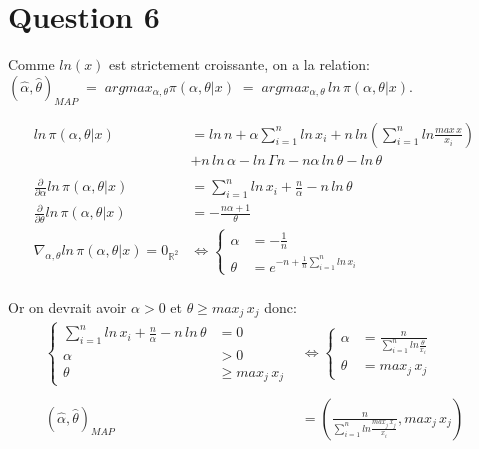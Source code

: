 \documentclass[
  12pt,
]{scrreprt}
\begin{document}
\hypertarget{question-6}{%
\section{Question 6}\label{question-6}}

Comme \(ln(x)\) est strictement croissante, on a la relation:\\
\((\hat{\alpha},\hat{\theta})_{MAP}\; = \;argmax_{\alpha,\theta} \pi(\alpha,\theta|x)\; = \;argmax_{\alpha,\theta}\,ln\,\pi(\alpha,\theta|x)\).

\[\begin{aligned}
ln\,\pi(\alpha,\theta|x) &= ln\,n+\alpha\sum_{i=1}^n ln\,x_i + n\,ln \left ( \sum_{i=1}^n ln\frac{max\,x}{x_i}\right )\\
&+n\,ln\,\alpha - ln\,\Gamma{n} - n\alpha\,ln\,\theta - ln\,\theta\\
&\\
\frac{\partial}{\partial\alpha}ln\,\pi(\alpha,\theta|x) &= \sum_{i=1}^n ln\,x_i + \frac{n}{\alpha} - n\,ln\,\theta\\
\frac{\partial}{\partial\theta}ln\,\pi(\alpha,\theta|x) &= -\frac{n\alpha+1}{\theta}
&\\
\nabla_{\alpha,\theta}ln\,\pi(\alpha,\theta|x) = 0_{\mathbb{R}^2} &\Leftrightarrow
\begin{cases}
\alpha &=-\frac{1}{n} \\
\theta &= e^{-n+\frac{1}{n}\sum_{i=1}^n ln\,x_i}
\end{cases}\\
\end{aligned}\]

Or on devrait avoir \(\alpha > 0\) et \(\theta \geq max_j\,x_j\) donc:
\[\begin{aligned}
\begin{cases}
\sum_{i=1}^n ln\,x_i + \frac{n}{\alpha} - n\,ln\,\theta &= 0\\
\alpha &> 0\\
\theta &\geq max_j\,x_j
\end{cases}&\Leftrightarrow
\begin{cases}
\alpha &= \frac{n}{\sum_{i=1}^n ln \frac{\theta}{x_i}}\\
\theta &= max_j\,x_j
\end{cases}
&\\
&\\
(\hat{\alpha},\hat{\theta})_{MAP} &= \left (\frac{n}{\sum_{i=1}^n ln \frac{max_j\,x_j}{x_i}}, max_j\,x_j\right)
\end{aligned}\]
\end{document}
